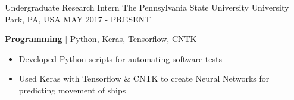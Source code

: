 

\begin{cventries}
	
	\cventry
	{Undergraduate Research Intern} %
	{The Pennsylvania State University} %
	{University Park, PA, USA} %
	{MAY 2017 - PRESENT} %
	{
		\begin{cvitems} %
			\item {\textbf{Programming} | {\color{awesome}Python, Keras, Tensorflow, CNTK}
				\begin{itemize}[noitemsep,wide=0pt, leftmargin=\dimexpr{} + 2\relax]
					\item[\textbullet]{Developed Python scripts for automating software tests}
					\item[\textbullet]{Used Keras with Tensorflow \& CNTK to create Neural Networks for predicting movement of ships}
				\end{itemize}}
		\end{cvitems}
	}
	

\end{cventries}
